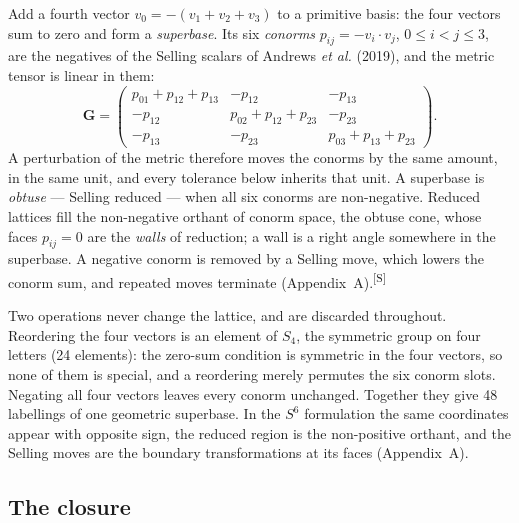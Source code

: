 \documentclass[preprint,pdf]{iucr}          %
\makeatletter
\newcommand{\Gmet}{\mathbf{G}}
\newcommand{\chk}[1]{\textsuperscript{[S\@nameuse{zn@#1}]}}
\makeatother
\begin{document}
Add a fourth vector $v_0=-(v_1+v_2+v_3)$ to a primitive basis: the four vectors sum to zero and form a \emph{superbase}. Its six \emph{conorms} $p_{ij}=-v_i\cdot v_j$, $0\le i<j\le3$, are the negatives of the Selling scalars of Andrews \emph{et al.} (2019), and the metric tensor is linear in them:
\begin{equation}
\Gmet=\begin{pmatrix}p_{01}+p_{12}+p_{13}&-p_{12}&-p_{13}\\-p_{12}&p_{02}+p_{12}+p_{23}&-p_{23}\\-p_{13}&-p_{23}&p_{03}+p_{13}+p_{23}\end{pmatrix}.
\label{eq:gram}
\end{equation}
A perturbation of the metric therefore moves the conorms by the same amount, in the same unit, and every tolerance below inherits that unit. A superbase is \emph{obtuse} --- Selling reduced --- when all six conorms are non-negative. Reduced lattices fill the non-negative orthant of conorm space, the obtuse cone, whose faces $p_{ij}=0$ are the \emph{walls} of reduction; a wall is a right angle somewhere in the superbase. A negative conorm is removed by a Selling move, which lowers the conorm sum, and repeated moves terminate (Appendix~A).\chk{z:reduction-step}

Two operations never change the lattice, and are discarded throughout. Reordering the four vectors is an element of $S_4$, the symmetric group on four letters (24 elements): the zero-sum condition is symmetric in the four vectors, so none of them is special, and a reordering merely permutes the six conorm slots. Negating all four vectors leaves every conorm unchanged. Together they give 48 labellings of one geometric superbase. In the $S^6$ formulation the same coordinates appear with opposite sign, the reduced region is the non-positive orthant, and the Selling moves are the boundary transformations at its faces (Appendix~A).

\subsection{The closure}
\label{sec:closure}
\end{document}
